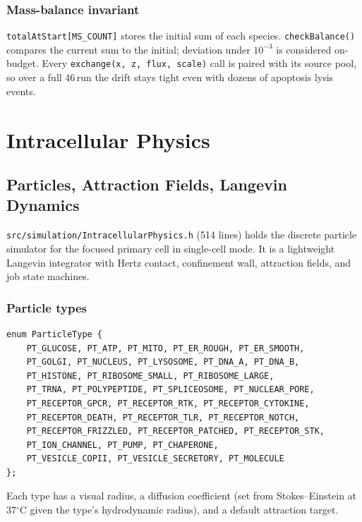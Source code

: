 \documentclass[11pt,letterpaper,twoside,openany]{book}
\newcommand{\code}[1]{\texttt{#1}}
\newcommand{\file}[1]{\texttt{\small#1}}
\newcommand{\bioh}{\text{bio-h}}
\begin{document}
\section{Mass-balance invariant}

\code{totalAtStart[MS\_COUNT]} stores the initial sum of each species.
\code{checkBalance()} compares the current sum to the initial;
deviation under $10^{-3}$ is considered on-budget. Every
\code{exchange(x, z, flux, scale)} call is paired with its source
pool, so over a full 46\,\bioh run the drift stays tight even with
dozens of apoptosis lysis events.

\part{Intracellular Physics}

\chapter{Particles, Attraction Fields, Langevin Dynamics}
\label{ch:intraphysics}

\file{src/simulation/IntracellularPhysics.h} (514 lines) holds the
discrete particle simulator for the focused primary cell in
single-cell mode. It is a lightweight Langevin integrator with
Hertz contact, confinement wall, attraction fields, and job state
machines.

\section{Particle types}

\begin{lstlisting}
enum ParticleType {
    PT_GLUCOSE, PT_ATP, PT_MITO, PT_ER_ROUGH, PT_ER_SMOOTH,
    PT_GOLGI, PT_NUCLEUS, PT_LYSOSOME, PT_DNA_A, PT_DNA_B,
    PT_HISTONE, PT_RIBOSOME_SMALL, PT_RIBOSOME_LARGE,
    PT_TRNA, PT_POLYPEPTIDE, PT_SPLICEOSOME, PT_NUCLEAR_PORE,
    PT_RECEPTOR_GPCR, PT_RECEPTOR_RTK, PT_RECEPTOR_CYTOKINE,
    PT_RECEPTOR_DEATH, PT_RECEPTOR_TLR, PT_RECEPTOR_NOTCH,
    PT_RECEPTOR_FRIZZLED, PT_RECEPTOR_PATCHED, PT_RECEPTOR_STK,
    PT_ION_CHANNEL, PT_PUMP, PT_CHAPERONE,
    PT_VESICLE_COPII, PT_VESICLE_SECRETORY, PT_MOLECULE
};
\end{lstlisting}

Each type has a visual radius, a diffusion coefficient (set from
Stokes--Einstein at 37$^\circ$C given the type's hydrodynamic radius),
and a default attraction target.
\end{document}
